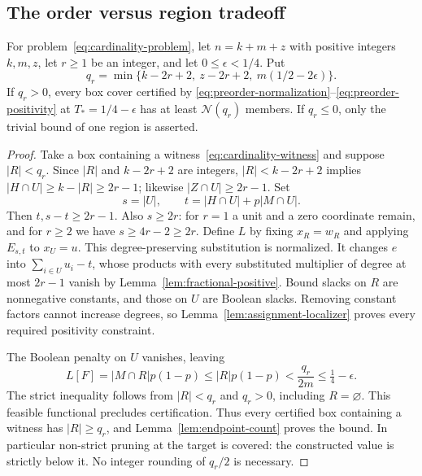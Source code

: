 \subsection{The order versus region tradeoff}
\begin{theorem}
\label{thm:preordering-cover}
For problem~\eqref{eq:cardinality-problem}, let
$n=k+m+z$ with positive integers $k,m,z$, let $r\ge1$ be an integer,
and let $0\le\epsilon<1/4$. Put
\begin{equation}\label{eq:qr}
 q_r=\min\{k-2r+2,\ z-2r+2,\ m(1/2-2\epsilon)\}.
\end{equation}
If $q_r>0$, every box cover certified by
\eqref{eq:preorder-normalization}--\eqref{eq:preorder-positivity} at
$T_*=1/4-\epsilon$ has at least $\mathcal N(q_r)$ members.
If $q_r\le0$, only the trivial bound of one region is asserted.
\end{theorem}
\begin{proof}
Take a box containing a witness~\eqref{eq:cardinality-witness} and
suppose $|R|<q_r$. Since $|R|$ and $k-2r+2$ are integers,
$|R|<k-2r+2$ implies $|H\cap U|\ge k-|R|\ge2r-1$;
likewise $|Z\cap U|\ge2r-1$. Set
\[
 s=|U|,\qquad t=|H\cap U|+p|M\cap U|.
\]
Then $t,s-t\ge2r-1$. Also $s\ge2r$: for $r=1$ a unit and a zero
coordinate remain, and for $r\ge2$ we have $s\ge4r-2\ge2r$.
Define $L$ by fixing $x_R=w_R$ and applying $E_{s,t}$ to $x_U=u$.
This degree-preserving substitution is normalized. It changes $e$ into
$\sum_{i\in U}u_i-t$, whose products with every substituted multiplier
of degree at most $2r-1$ vanish by
Lemma~\ref{lem:fractional-positive}. Bound slacks on $R$ are
nonnegative constants, and those on $U$ are Boolean slacks. Removing
constant factors cannot increase degrees, so
Lemma~\ref{lem:assignment-localizer} proves every required positivity
constraint.

The Boolean penalty on $U$ vanishes, leaving
\begin{equation}\label{eq:restricted-penalty}
 L[F]=|M\cap R|p(1-p)\le |R|p(1-p)
 <\frac{q_r}{2m}\le\tfrac14-\epsilon.
\end{equation}
The strict inequality follows from $|R|<q_r$ and $q_r>0$, including
$R=\varnothing$. This feasible functional precludes certification.
Thus every certified box containing a witness has $|R|\ge q_r$,
and Lemma~\ref{lem:endpoint-count} proves the bound. In particular
non-strict pruning at the target is covered: the constructed value is
strictly below it. No integer rounding of $q_r/2$ is necessary.
\end{proof}

